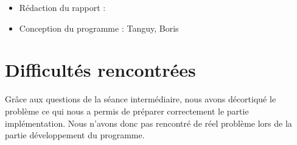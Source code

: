 \documentclass[11pt]{article}
\begin{document}
\begin{itemize}
\item Rédaction du rapport :
\item Conception du programme : Tanguy, Boris
\end{itemize}

\section{Difficultés rencontrées}
Grâce aux questions de la séance intermédiaire, nous avons décortiqué le problème ce qui nous a permis de préparer correctement le partie implémentation. Nous n'avons donc pas rencontré de réel problème lors de la partie développement du programme.
\end{document}
